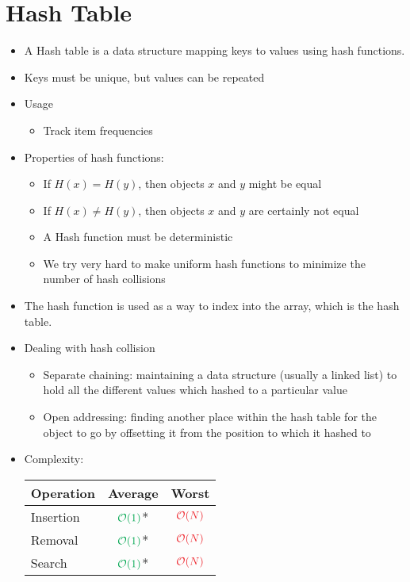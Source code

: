 \section{Hash Table}
\begin{itemize}
	\item A Hash table is a data structure mapping keys to values using hash functions.
	\item Keys must be unique, but values can be repeated
	\item Usage
	\begin{itemize}
		\item Track item frequencies
	\end{itemize}
	\item Properties of hash functions:
	\begin{itemize}
		\item If $ H(x) = H(y) $, then objects $ x $ and $ y $ might be equal
		\item If $ H(x) \neq H(y) $, then objects $ x $ and $ y $ are certainly not equal
		\item A Hash function must be deterministic
		\item We try very hard to make uniform hash functions to minimize the number of hash collisions
	\end{itemize}
	\item The hash function is used as a way to index into the array, which is the hash table.
	\item Dealing with hash collision
	\begin{itemize}
		\item Separate chaining: maintaining a data structure (usually a linked list) to hold all the different values which hashed to a particular value
		\item Open addressing: finding another place within the hash table for the object to go by offsetting it from the position to which it hashed to
	\end{itemize}
	\item Complexity:
	\begin{center}
		\begin{tabular}{|l|c|c|}
			\hline
			Operation & Average & Worst \\ \hline
			Insertion & $ \color{Green} \mathcal{O}(1) $* & $ \color{Red} \mathcal{O}(N) $\\ \hline
			Removal & $ \color{Green} \mathcal{O}(1) $* & $ \color{Red} \mathcal{O}(N) $\\ \hline
			Search & $ \color{Green} \mathcal{O}(1) $* & $ \color{Red} \mathcal{O}(N) $\\ \hline
		\end{tabular}
	\end{center}
\end{itemize}

